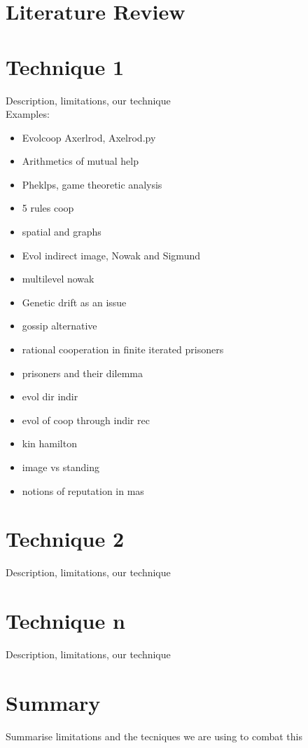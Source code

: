 \documentclass[]{final_report}
\begin{document}
\section{Literature Review}

\section{Technique 1}
Description, limitations, our technique\\
Examples:
\begin{itemize}
	\item Evolcoop Axerlrod, Axelrod.py
	\item Arithmetics of mutual help
	\item Pheklps, game theoretic analysis
	\item 5 rules coop
	\item spatial and graphs
	\item Evol indirect image, Nowak and Sigmund
	\item multilevel nowak
	\item Genetic drift as an issue
	\item gossip alternative
	\item rational cooperation in finite iterated prisoners
	\item prisoners and their dilemma
	\item evol dir indir
	\item evol of coop through indir rec
	\item kin hamilton
	\item image vs standing
	\item notions of reputation in mas
\end{itemize}

\section{Technique 2}
Description, limitations, our technique

\section{Technique n}
Description, limitations, our technique

\section{Summary}
Summarise limitations and the tecniques we are using to combat this
\end{document}
